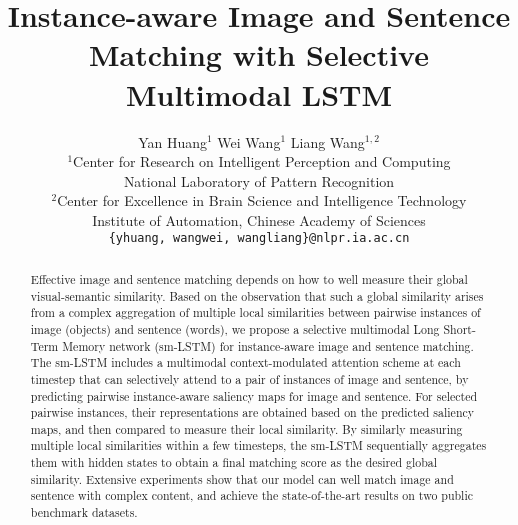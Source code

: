 \documentclass[10pt,twocolumn,letterpaper]{article}
\begin{document}
\title{Instance-aware Image and Sentence Matching with Selective Multimodal LSTM}

\author{Yan Huang$^1$ \hspace{7mm} Wei Wang$^1$  \hspace{7mm} Liang Wang$^{1,2}$\\
$^1$Center for Research on Intelligent Perception and Computing\\
National Laboratory of Pattern Recognition\\
$^2$Center for Excellence in Brain Science and Intelligence Technology\\
Institute of Automation, Chinese Academy of Sciences\\
{\tt\small \{yhuang, wangwei, wangliang\}@nlpr.ia.ac.cn}
}




\makeatletter
\g@addto@macro{}
\makeatother
\maketitle


\begin{abstract}
Effective image and sentence matching depends on how to well measure
their global visual-semantic similarity.
Based on the observation that
such a global similarity arises from a complex aggregation of
multiple local similarities between
pairwise instances of image (objects) and sentence (words),
we propose a selective multimodal Long Short-Term Memory network (sm-LSTM)
for instance-aware image and sentence matching.
The sm-LSTM includes a multimodal context-modulated attention scheme at each timestep
that can selectively attend to a pair of instances of image and sentence,
by predicting pairwise instance-aware saliency maps for image and sentence.
For selected pairwise instances, their representations are obtained based on
the predicted saliency maps, and then compared to measure their local similarity.
By similarly measuring multiple local similarities within a few timesteps,
the sm-LSTM sequentially aggregates them with hidden states
to obtain a final matching score as the desired global similarity.
Extensive experiments show that
our model can well match image and sentence with complex content,
and achieve the state-of-the-art results on two public benchmark datasets.
\end{abstract}
\end{document}
